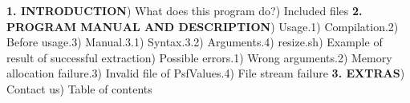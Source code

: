 \documentclass{article}
\begin{document}
\noindent\textbf{1. INTRODUCTION}) What does this program do?) Included files\newline
\textbf{2. PROGRAM MANUAL AND DESCRIPTION}) Usage.1) Compilation.2) Before usage.3) Manual.3.1) Syntax.3.2) Arguments.4) resize.sh) Example of result of successful extraction) Possible errors.1) Wrong arguments.2) Memory allocation failure.3) Invalid file of PsfValues.4) File stream failure\newline
\textbf{3. EXTRAS}) Contact us) Table of contents\newline
\end{document}
